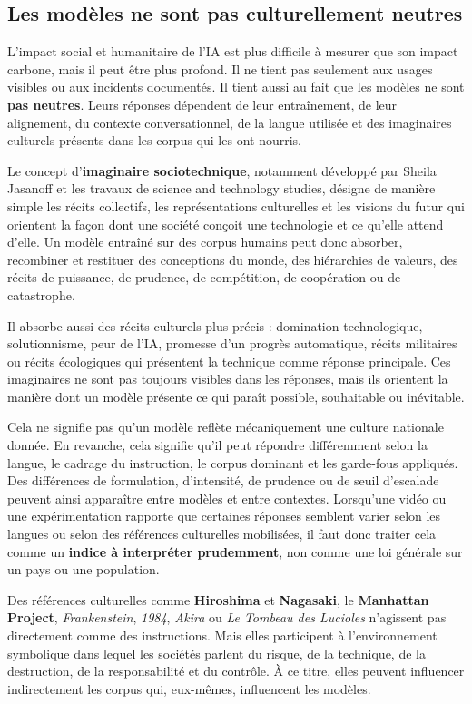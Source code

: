 \documentclass[
  10pt,
  a4paper,
  DIV=11,
  numbers=noendperiod,
  oneside]{scrreprt}
\let\oldtextbf\textbf
\renewcommand{\textbf}[1]{\oldtextbf{\textcolor{cmmnavy}{#1}}}
\let\oldemph\emph
\renewcommand{\emph}[1]{\oldemph{\textcolor{cmmgray}{#1}}}
\begin{document}
\subsection{Les modèles ne sont pas culturellement
neutres}\label{les-moduxe8les-ne-sont-pas-culturellement-neutres}

L'impact social et humanitaire de l'IA est plus difficile à mesurer que
son impact carbone, mais il peut être plus profond. Il ne tient pas
seulement aux usages visibles ou aux incidents documentés. Il tient
aussi au fait que les modèles ne sont \textbf{pas neutres}. Leurs
réponses dépendent de leur entraînement, de leur alignement, du contexte
conversationnel, de la langue utilisée et des imaginaires culturels
présents dans les corpus qui les ont nourris.

Le concept d'\textbf{imaginaire sociotechnique}, notamment développé par
Sheila Jasanoff et les travaux de science and technology studies,
désigne de manière simple les récits collectifs, les représentations
culturelles et les visions du futur qui orientent la façon dont une
société conçoit une technologie et ce qu'elle attend d'elle. Un modèle
entraîné sur des corpus humains peut donc absorber, recombiner et
restituer des conceptions du monde, des hiérarchies de valeurs, des
récits de puissance, de prudence, de compétition, de coopération ou de
catastrophe.

Il absorbe aussi des récits culturels plus précis : domination
technologique, solutionnisme, peur de l'IA, promesse d'un progrès
automatique, récits militaires ou récits écologiques qui présentent la
technique comme réponse principale. Ces imaginaires ne sont pas toujours
visibles dans les réponses, mais ils orientent la manière dont un modèle
présente ce qui paraît possible, souhaitable ou inévitable.

Cela ne signifie pas qu'un modèle reflète mécaniquement une culture
nationale donnée. En revanche, cela signifie qu'il peut répondre
différemment selon la langue, le cadrage du instruction, le corpus
dominant et les garde-fous appliqués. Des différences de formulation,
d'intensité, de prudence ou de seuil d'escalade peuvent ainsi apparaître
entre modèles et entre contextes. Lorsqu'une vidéo ou une
expérimentation rapporte que certaines réponses semblent varier selon
les langues ou selon des références culturelles mobilisées, il faut donc
traiter cela comme un \textbf{indice à interpréter prudemment}, non
comme une loi générale sur un pays ou une population.

Des références culturelles comme \textbf{Hiroshima} et
\textbf{Nagasaki}, le \textbf{Manhattan Project}, \emph{Frankenstein},
\emph{1984}, \emph{Akira} ou \emph{Le Tombeau des Lucioles} n'agissent
pas directement comme des instructions. Mais elles participent à
l'environnement symbolique dans lequel les sociétés parlent du risque,
de la technique, de la destruction, de la responsabilité et du contrôle.
À ce titre, elles peuvent influencer indirectement les corpus qui,
eux-mêmes, influencent les modèles.
\end{document}
